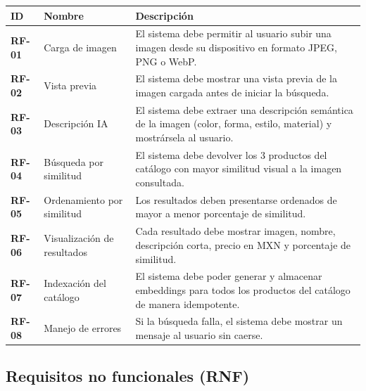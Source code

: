 \documentclass[11pt,letterpaper]{article}
\newcommand{\req}[1]{\textbf{#1}}
\begin{document}
\begin{longtable}{@{}l p{4.2cm} p{8cm}@{}}
\toprule
\textbf{ID} & \textbf{Nombre} & \textbf{Descripción} \\
\midrule
\endhead
\req{RF-01} & Carga de imagen & El sistema debe permitir al usuario subir una imagen desde su dispositivo en formato JPEG, PNG o WebP. \\
\req{RF-02} & Vista previa & El sistema debe mostrar una vista previa de la imagen cargada antes de iniciar la búsqueda. \\
\req{RF-03} & Descripción IA & El sistema debe extraer una descripción semántica de la imagen (color, forma, estilo, material) y mostrársela al usuario. \\
\req{RF-04} & Búsqueda por similitud & El sistema debe devolver los 3 productos del catálogo con mayor similitud visual a la imagen consultada. \\
\req{RF-05} & Ordenamiento por similitud & Los resultados deben presentarse ordenados de mayor a menor porcentaje de similitud. \\
\req{RF-06} & Visualización de resultados & Cada resultado debe mostrar imagen, nombre, descripción corta, precio en MXN y porcentaje de similitud. \\
\req{RF-07} & Indexación del catálogo & El sistema debe poder generar y almacenar embeddings para todos los productos del catálogo de manera idempotente. \\
\req{RF-08} & Manejo de errores & Si la búsqueda falla, el sistema debe mostrar un mensaje al usuario sin caerse. \\
\bottomrule
\end{longtable}

\subsection{Requisitos no funcionales (RNF)}
\end{document}
